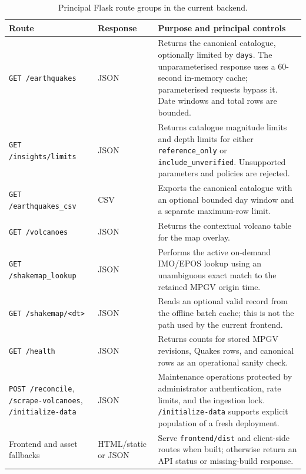 \documentclass[12pt]{article}
\begin{document}
\begin{table}[H]
\centering
\caption{Principal Flask route groups in the current backend.}
\label{tab:backend-routes}
\footnotesize
\setlength{\tabcolsep}{3pt}
\renewcommand{\arraystretch}{1.1}
\begin{tabular}{>{\raggedright\arraybackslash}p{4.0cm}>{\raggedright\arraybackslash}p{2.1cm}>{\raggedright\arraybackslash}p{8.5cm}}
\toprule
\textbf{Route} & \textbf{Response} & \textbf{Purpose and principal controls} \\
\midrule
\texttt{GET /earthquakes} & JSON & Returns the canonical catalogue, optionally limited by \texttt{days}. The unparameterised response uses a 60-second in-memory cache; parameterised requests bypass it. Date windows and total rows are bounded. \\
\texttt{GET /insights/limits} & JSON & Returns catalogue magnitude limits and depth limits for either \texttt{reference\_only} or \texttt{include\_unverified}. Unsupported parameters and policies are rejected. \\
\texttt{GET /earthquakes\_csv} & CSV & Exports the canonical catalogue with an optional bounded day window and a separate maximum-row limit. \\
\texttt{GET /volcanoes} & JSON & Returns the contextual volcano table for the map overlay. \\
\texttt{GET /shakemap\_lookup} & JSON & Performs the active on-demand IMO/EPOS lookup using an unambiguous exact match to the retained MPGV origin time. \\
\texttt{GET /shakemap/<dt>} & JSON & Reads an optional valid record from the offline batch cache; this is not the path used by the current frontend. \\
\texttt{GET /health} & JSON & Returns counts for stored MPGV revisions, Quakes rows, and canonical rows as an operational sanity check. \\
\texttt{POST /reconcile}, \texttt{/scrape-volcanoes}, \texttt{/initialize-data} & JSON & Maintenance operations protected by administrator authentication, rate limits, and the ingestion lock. \texttt{/initialize-data} supports explicit population of a fresh deployment. \\
Frontend and asset fallbacks & HTML/static or JSON & Serve \texttt{frontend/dist} and client-side routes when built; otherwise return an API status or missing-build response. \\
\bottomrule
\end{tabular}
\end{table}
\end{document}
